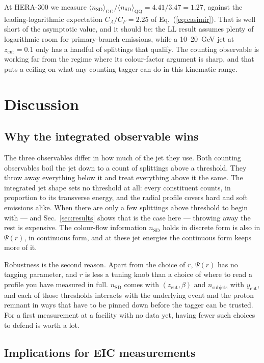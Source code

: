 \documentclass[reprint,amsmath,amssymb,aps,prd,floatfix]{revtex4-2}
\begin{document}
At HERA-300 we measure
$\langle n_{\mathrm{SD}}\rangle_{\mathrm{GG}} /
 \langle n_{\mathrm{SD}}\rangle_{\mathrm{QQ}} = 4.41/3.47 = 1.27$, against the
leading-logarithmic expectation $C_A/C_F = 2.25$ of Eq.~(\ref{eq:casimir}). That
is well short of the asymptotic value, and it should be: the LL result assumes
plenty of logarithmic room for primary-branch emissions, while a 10--20~GeV jet
at $z_{\mathrm{cut}} = 0.1$ only has a handful of splittings that qualify. The
counting observable is working far from the regime where its colour-factor
argument is sharp, and that puts a ceiling on what any counting tagger can do in
this kinematic range.

\section{Discussion}\label{sec:discussion}

\subsection{Why the integrated observable wins}

The three observables differ in how much of the jet they use. Both counting
observables boil the jet down to a count of splittings above a threshold. They
throw away everything below it and treat everything above it the same. The
integrated jet shape sets no threshold at all: every constituent counts, in
proportion to its transverse energy, and the radial profile covers hard and soft
emissions alike. When there are only a few splittings above threshold to begin
with --- and Sec.~\ref{sec:results} shows that is the case here --- throwing away
the rest is expensive. The colour-flow information $n_{\mathrm{SD}}$ holds in
discrete form is also in $\Psi(r)$, in continuous form, and at these jet energies
the continuous form keeps more of it.

Robustness is the second reason. Apart from the choice of $r$, $\Psi(r)$ has no
tagging parameter, and $r$ is less a tuning knob than a choice of where to read a
profile you have measured in full. $n_{\mathrm{SD}}$ comes with
$(z_{\mathrm{cut}}, \beta)$ and $n_{\mathrm{subjets}}$ with $y_{\mathrm{cut}}$,
and each of those thresholds interacts with the underlying event and the proton
remnant in ways that have to be pinned down before the tagger can be trusted. For
a first measurement at a facility with no data yet, having fewer such choices to
defend is worth a lot.

\subsection{Implications for EIC measurements}
\end{document}
